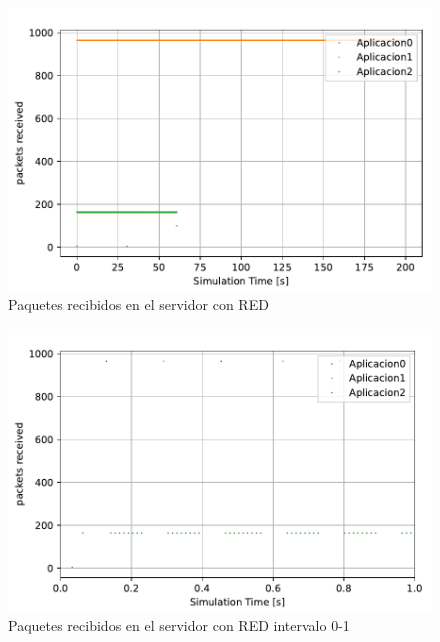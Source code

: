 \begin{figure}
    \centering
    \includegraphics{graficas/RED/packetsReceived_RED.pdf}
    \caption{Paquetes recibidos en el servidor con RED}
    \label{fig:sinqos_pktreceived99100}
\end{figure}

\begin{figure}
    \centering
    \includegraphics{graficas/RED/packetsReceived_RED_1.pdf}
    \caption{Paquetes recibidos en el servidor con RED intervalo 0-1}
    \label{fig:sinqos_pktreceived99100}
\end{figure}

